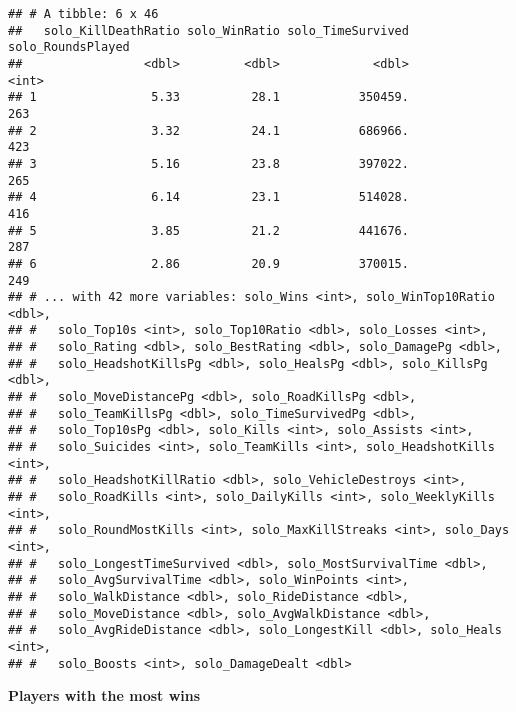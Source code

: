\documentclass[]{article}
\begin{document}
\begin{verbatim}
## # A tibble: 6 x 46
##   solo_KillDeathRatio solo_WinRatio solo_TimeSurvived solo_RoundsPlayed
##                 <dbl>         <dbl>             <dbl>             <int>
## 1                5.33          28.1           350459.               263
## 2                3.32          24.1           686966.               423
## 3                5.16          23.8           397022.               265
## 4                6.14          23.1           514028.               416
## 5                3.85          21.2           441676.               287
## 6                2.86          20.9           370015.               249
## # ... with 42 more variables: solo_Wins <int>, solo_WinTop10Ratio <dbl>,
## #   solo_Top10s <int>, solo_Top10Ratio <dbl>, solo_Losses <int>,
## #   solo_Rating <dbl>, solo_BestRating <dbl>, solo_DamagePg <dbl>,
## #   solo_HeadshotKillsPg <dbl>, solo_HealsPg <dbl>, solo_KillsPg <dbl>,
## #   solo_MoveDistancePg <dbl>, solo_RoadKillsPg <dbl>,
## #   solo_TeamKillsPg <dbl>, solo_TimeSurvivedPg <dbl>,
## #   solo_Top10sPg <dbl>, solo_Kills <int>, solo_Assists <int>,
## #   solo_Suicides <int>, solo_TeamKills <int>, solo_HeadshotKills <int>,
## #   solo_HeadshotKillRatio <dbl>, solo_VehicleDestroys <int>,
## #   solo_RoadKills <int>, solo_DailyKills <int>, solo_WeeklyKills <int>,
## #   solo_RoundMostKills <int>, solo_MaxKillStreaks <int>, solo_Days <int>,
## #   solo_LongestTimeSurvived <dbl>, solo_MostSurvivalTime <dbl>,
## #   solo_AvgSurvivalTime <dbl>, solo_WinPoints <int>,
## #   solo_WalkDistance <dbl>, solo_RideDistance <dbl>,
## #   solo_MoveDistance <dbl>, solo_AvgWalkDistance <dbl>,
## #   solo_AvgRideDistance <dbl>, solo_LongestKill <dbl>, solo_Heals <int>,
## #   solo_Boosts <int>, solo_DamageDealt <dbl>
\end{verbatim}

\textbf{Players with the most wins}
\end{document}
